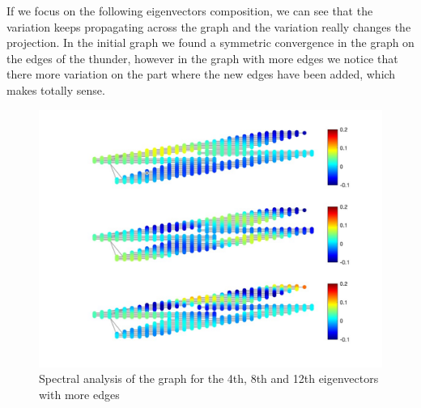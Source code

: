 \documentclass[12pt]{article}
\begin{document}
If we focus on the following eigenvectors composition, we can see that the variation keeps propagating across the graph and the variation really changes the projection. In the initial graph we found a symmetric convergence in the graph on the edges of the thunder, however in the graph with more edges we notice that there more variation on the part where the new edges have been added, which makes totally sense.
\begin{figure}[H]
	\centering
	\includegraphics[width=12cm]{more_edges_second_ev.jpg}
	\caption{Spectral analysis of the graph for the 4th, 8th and 12th eigenvectors with more edges}
	\label{fig:MoreEdgesSpectralRepresentationSecondEv}
\end{figure}
\end{document}
